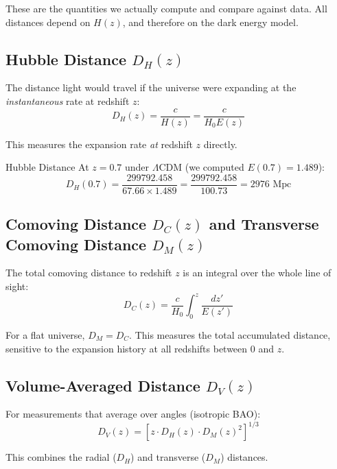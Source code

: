 \documentclass[11pt,a4paper]{article}
\newcommand{\LCDM}{$\Lambda$CDM}
\begin{document}
These are the quantities we actually compute and compare against data. All distances depend on $H(z)$, and therefore on the dark energy model.

\subsection{Hubble Distance $D_H(z)$}

The distance light would travel if the universe were expanding at the \textit{instantaneous} rate at redshift $z$:
\begin{equation}
D_H(z) = \frac{c}{H(z)} = \frac{c}{H_0 E(z)}
\end{equation}

This measures the expansion rate \textit{at} redshift $z$ directly.

\begin{examplebox}{Hubble Distance}
At $z = 0.7$ under \LCDM{} (we computed $E(0.7) = 1.489$):
\begin{equation}
D_H(0.7) = \frac{299792.458}{67.66 \times 1.489} = \frac{299792.458}{100.73} = 2976 \text{ Mpc}
\end{equation}
\end{examplebox}

\subsection{Comoving Distance $D_C(z)$ and Transverse Comoving Distance $D_M(z)$}

The total comoving distance to redshift $z$ is an integral over the whole line of sight:
\begin{equation}
D_C(z) = \frac{c}{H_0}\int_0^z \frac{dz'}{E(z')}
\end{equation}

For a flat universe, $D_M = D_C$. This measures the total accumulated distance, sensitive to the expansion history at all redshifts between 0 and $z$.

\subsection{Volume-Averaged Distance $D_V(z)$}

For measurements that average over angles (isotropic BAO):
\begin{equation}
D_V(z) = \left[z \cdot D_H(z) \cdot D_M(z)^2\right]^{1/3}
\end{equation}

This combines the radial ($D_H$) and transverse ($D_M$) distances.
\end{document}
